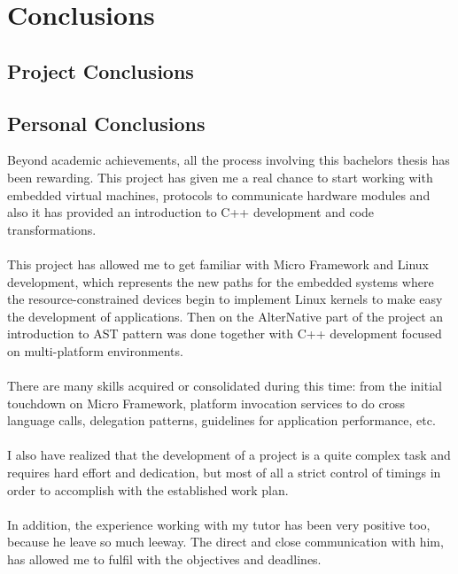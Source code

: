 \chapter{Conclusions}\label{C:Conclusions}
\section{Project Conclusions}\label{S:Project-Conclusions}
\section{Personal Conclusions}\label{S:Personal-Conclusions}
Beyond academic achievements, all the process involving this bachelors thesis has been rewarding. This project has given me a real chance to start working with embedded virtual machines, protocols to communicate hardware modules and also it has provided an introduction to C++ development and code transformations.
\\
\\
This project has allowed me to get familiar with Micro Framework and Linux development, which represents the new paths for the embedded systems where the resource-constrained devices begin to implement Linux kernels to make easy the development of applications. Then on the AlterNative part of the project an introduction to AST pattern was done together with C++ development focused on multi-platform environments. 
\\
\\
There are many skills acquired or consolidated during this time: from the initial touchdown on Micro Framework, platform invocation services to do cross language calls, delegation patterns, guidelines for application performance, etc.
\\
\\
I also have realized that the development of a project is a quite complex task and requires hard effort and dedication, but most of all a strict control of timings in order to accomplish with the established work plan.
\\
\\
In addition, the experience working with my tutor has been very positive too, because he leave so much leeway. The direct and close communication with him, has allowed me to fulfil with the objectives and deadlines.

